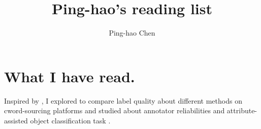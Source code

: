 \documentclass[a4paper]{article}
\title{\textbf{Ping-hao's reading list}}
\author{Ping-hao Chen}
\begin{document}
\maketitle

\section{What I have read.}

Inspired by \cite{kulesza2014structured}, I explored to compare label quality about different methods on cword-sourcing platforms \cite{welinder2010online, whitehill2009whose} and studied about annotator reliabilities \cite{nowak2010reliable} and attribute-assisted object classification task \cite{liu2007survey, paiva2015approach, hwang2011sharing, lampert2009learning}.


 

\end{document}
